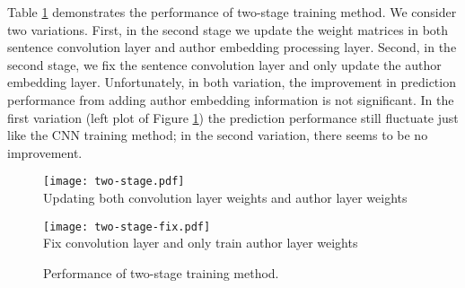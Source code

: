 Table \ref{Fig:TwoStage} demonstrates the performance of two-stage training method. We consider two variations. 
First, in the second stage we update the weight matrices in both sentence convolution layer and author embedding
processing layer. Second, in the second stage, we fix the sentence convolution layer and only update the author embedding
layer. Unfortunately, in both variation, the improvement in prediction performance from adding author embedding
information is not significant. In the first variation (left plot of Figure \ref{Fig:TwoStage}) the prediction performance 
still fluctuate just like the CNN training method; in the second variation, there seems to be no improvement. 


\begin{figure}[tbp] %
   \centering
\begin{minipage}{0.5\linewidth}\centering
   \texttt{[image: two-stage.pdf]} 
   \\{\footnotesize Updating both convolution layer weights and author layer weights   }
\end{minipage}
\begin{minipage}{0.49\linewidth}\centering
   \texttt{[image: two-stage-fix.pdf]} 
   \\{\footnotesize Fix convolution layer and only train author layer weights   }
\end{minipage}
\caption{Performance of two-stage training method.}
\label{Fig:TwoStage}
\end{figure}